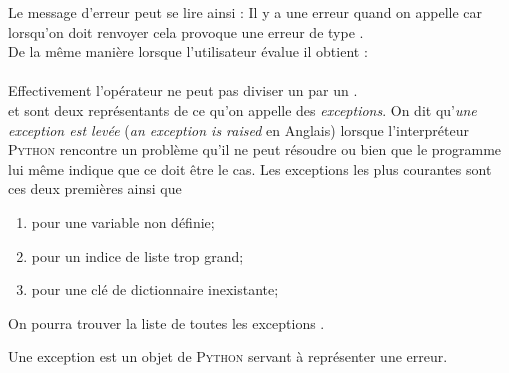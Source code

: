 \documentclass[a4paper,12pt,french]{book}
\begin{document}
Le message d'erreur peut se lire ainsi : Il y a une erreur quand on appelle  car lorsqu'on doit renvoyer  cela provoque une erreur de type .\\

De la même manière lorsque l'utilisateur évalue  il obtient :\\

{\color{red}}\\

Effectivement l'opérateur \pythoninline{/} ne peut pas diviser un  par un .\\

 et  sont deux représentants de ce qu'on appelle des \textit{exceptions}. On dit qu'\textit{une exception est levée} (\textit{an exception is raised} en Anglais) lorsque l'interpréteur \textsc{Python} rencontre un problème qu'il ne peut résoudre ou bien que le programme lui même indique que ce doit être le cas. Les exceptions les plus courantes sont ces deux premières ainsi que 
\begin{enumerate}[--]
	\item 	{} pour une variable non définie;
	\item 	{} pour un indice de liste trop grand;
	\item 	{} pour une clé de dictionnaire inexistante;
\end{enumerate}

On pourra trouver la liste de toutes les exceptions .

\begin{definition}[ : exception]
	Une exception est un objet de \textsc{Python} servant à représenter une erreur.
\end{definition}
\end{document}
